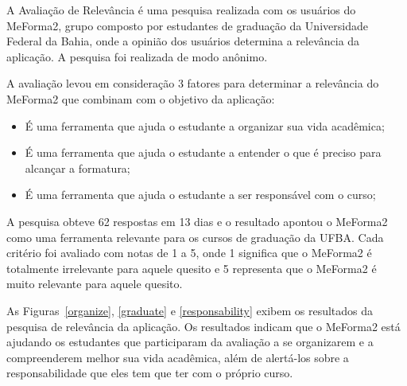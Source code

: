 A Avaliação de Relevância é uma pesquisa realizada com os usuários do MeForma2, grupo composto por estudantes de graduação da Universidade Federal da Bahia, onde a opinião dos usuários determina a relevância da aplicação. A pesquisa foi realizada de modo anônimo.

A avaliação levou em consideração 3 fatores para determinar a relevância do MeForma2 que combinam com o objetivo da aplicação:
\begin{itemize}
    \item É uma ferramenta que ajuda o estudante a organizar sua vida acadêmica;
    \item É uma ferramenta que ajuda o estudante a entender o que é preciso para alcançar a formatura;
    \item É uma ferramenta que ajuda o estudante a ser responsável com o curso;
\end{itemize}

A pesquisa obteve 62 respostas em 13 dias e o resultado apontou o MeForma2 como uma ferramenta relevante para os cursos de graduação da UFBA. Cada critério foi avaliado com notas de 1 a 5, onde 1 significa que o MeForma2 é totalmente irrelevante para aquele quesito e 5 representa que o MeForma2 é muito relevante para aquele quesito.

As Figuras~\ref{organize}, \ref{graduate} e \ref{responsability} exibem os resultados da pesquisa de relevância da aplicação. Os resultados indicam que o MeForma2 está ajudando os estudantes que participaram da avaliação a se organizarem e a compreenderem melhor sua vida acadêmica, além de alertá-los sobre a responsabilidade que eles tem que ter com o próprio curso.

